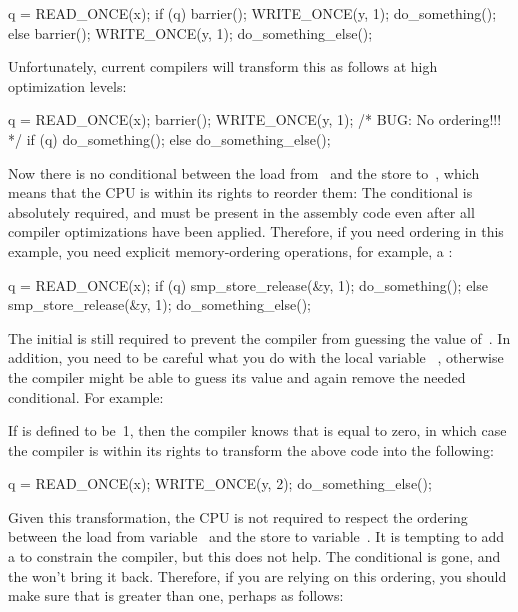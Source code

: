 \begin{VerbatimN}
q = READ_ONCE(x);
if (q) {
	barrier();
	WRITE_ONCE(y, 1);
	do_something();
} else {
	barrier();
	WRITE_ONCE(y, 1);
	do_something_else();
}
\end{VerbatimN}

Unfortunately, current compilers will transform this as follows at high
optimization levels:

\begin{VerbatimN}
q = READ_ONCE(x);
barrier();
WRITE_ONCE(y, 1);  /* BUG: No ordering!!! */
if (q)
	do_something();
else
	do_something_else();
\end{VerbatimN}

Now there is no conditional between the load from~ and the store
to~, which means that the CPU is within its rights to reorder them:
The conditional is absolutely required, and must be present in the
assembly code even after all compiler optimizations have been applied.
Therefore, if you need ordering in this example, you need explicit
memory-ordering operations, for example, a :

\begin{VerbatimN}
q = READ_ONCE(x);
if (q) {
	smp_store_release(&y, 1);
	do_something();
} else {
	smp_store_release(&y, 1);
	do_something_else();
}
\end{VerbatimN}

The initial  is still required to prevent the compiler from
guessing the value of~.
In addition, you need to be careful what you do with the local variable~%
,
otherwise the compiler might be able to guess its value and again remove
the needed conditional.
For example:


If  is defined to be~1, then the compiler knows that  is
equal to zero, in which case the compiler is within its rights to
transform the above code into the following:

\begin{VerbatimN}
q = READ_ONCE(x);
WRITE_ONCE(y, 2);
do_something_else();
\end{VerbatimN}

Given this transformation, the CPU is not required to respect the ordering
between the load from variable~ and the store to variable~.
It is tempting to add a  to constrain the compiler,
but this does not help.
The conditional is gone, and the  won't bring it back.
Therefore, if you are relying on this ordering, you should make sure
that  is greater than one, perhaps as follows:

